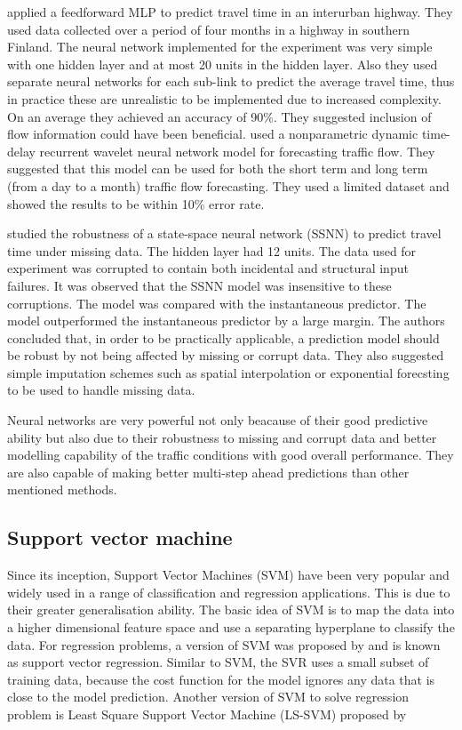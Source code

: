 \citet{innamaa2005short} applied a feedforward MLP to predict travel time in an interurban highway.
They used data collected over a period of four months in a highway in southern Finland. The neural
network implemented for the experiment was very simple with one hidden layer and at most 20 units in
the hidden layer. Also they used separate neural networks for each sub-link to predict the average
travel time, thus in practice these are unrealistic to be implemented due to increased complexity.
On an average they achieved an accuracy of 90\%. They suggested inclusion of flow information could
have been beneficial. \citet{jiang2005dynamic} used a nonparametric dynamic time-delay recurrent
wavelet neural network model for forecasting traffic flow. They suggested that this model can be
used for both the short term and long term (from a day to a month) traffic flow forecasting. They
used a limited dataset and showed the results to be within 10\% error rate.

\citet{van2005accurate} studied the robustness of a state-space neural network (SSNN) to predict
travel time under missing data. The hidden layer had 12 units. The data used for experiment was
corrupted to contain both incidental and structural input failures. It was observed that the
SSNN model was insensitive to these corruptions. The model was compared with the
instantaneous predictor. The model outperformed the instantaneous predictor by a large margin. The authors
concluded that, in order to be practically applicable, a prediction model should be robust by not
being affected by missing or corrupt data. They also suggested simple imputation schemes such as spatial
interpolation or exponential forecsting to be used to handle missing data.


Neural networks are very powerful not only beacause of their good predictive ability but also due to their
robustness to missing and corrupt data and better modelling capability of the traffic conditions
with good overall performance. They are also capable of making better multi-step ahead predictions
than other mentioned methods.

\subsection{Support vector machine}
Since its inception, Support Vector Machines (SVM) have been very popular and widely used in a range of
classification and regression applications. This is due to their greater generalisation ability.
The basic idea of SVM is to map the data into a higher dimensional feature space and use a separating
hyperplane to classify the data. For regression problems, a version of SVM was proposed by
\citet{smola1997support} and is known as support vector regression. Similar to SVM, the SVR uses
a small subset of training data, because the cost function for the model ignores any data that is
close to the model prediction. Another version of SVM to solve regression problem is Least
Square Support Vector Machine (LS-SVM) proposed by \citet{suykens2002least}


